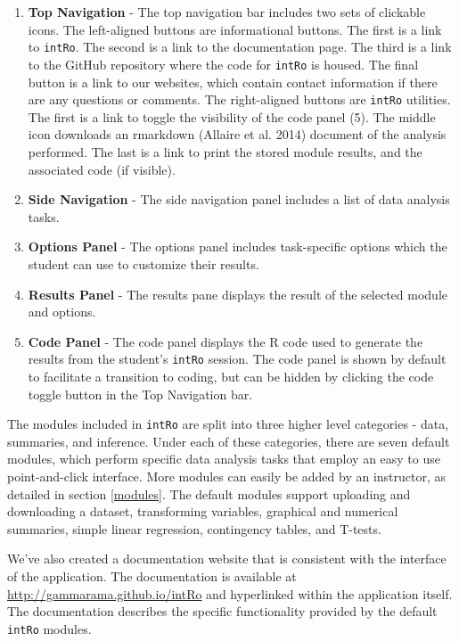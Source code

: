 \documentclass[12pt,]{article}
\providecommand{\tightlist}{%
  \setlength{\itemsep}{0pt}\setlength{\parskip}{0pt}}
\begin{document}
\begin{enumerate}
\def\labelenumi{\arabic{enumi}.}
\tightlist
\item
  \textbf{Top Navigation} - The top navigation bar includes two sets of
  clickable icons. The left-aligned buttons are informational buttons.
  The first is a link to \texttt{intRo}. The second is a link to the
  documentation page. The third is a link to the GitHub repository where
  the code for \texttt{intRo} is housed. The final button is a link to
  our websites, which contain contact information if there are any
  questions or comments. The right-aligned buttons are \texttt{intRo}
  utilities. The first is a link to toggle the visibility of the code
  panel (5). The middle icon downloads an rmarkdown (Allaire et al.
  2014) document of the analysis performed. The last is a link to print
  the stored module results, and the associated code (if visible).
\item
  \textbf{Side Navigation} - The side navigation panel includes a list
  of data analysis tasks.
\item
  \textbf{Options Panel} - The options panel includes task-specific
  options which the student can use to customize their results.
\item
  \textbf{Results Panel} - The results pane displays the result of the
  selected module and options.
\item
  \textbf{Code Panel} - The code panel displays the R code used to
  generate the results from the student's \texttt{intRo} session. The
  code panel is shown by default to facilitate a transition to coding,
  but can be hidden by clicking the code toggle button in the Top
  Navigation bar.
\end{enumerate}

The modules included in \texttt{intRo} are split into three higher level
categories - data, summaries, and inference. Under each of these
categories, there are seven default modules, which perform specific data
analysis tasks that employ an easy to use point-and-click interface.
More modules can easily be added by an instructor, as detailed in
section \ref{modules}. The default modules support uploading and
downloading a dataset, transforming variables, graphical and numerical
summaries, simple linear regression, contingency tables, and T-tests.

We've also created a documentation website that is consistent with the
interface of the application. The documentation is available at
\url{http://gammarama.github.io/intRo} and hyperlinked within the
application itself. The documentation describes the specific
functionality provided by the default \texttt{intRo} modules.
\end{document}
